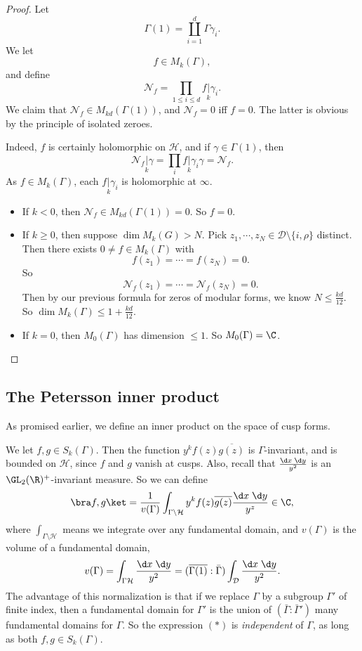 \documentclass[a4paper]{article}
\renewcommand{\H}{\mathcal{H}}
\begin{document}
\begin{proof}
  Let
  \[
    \Gamma(1) = \coprod_{i = 1}^d \Gamma \gamma_i.
  \]
  We let
  \[
    f \in M_k(\Gamma),
  \]
  and define
  \[
    \mathcal{N}_f = \prod_{1 \leq i \leq d} f\underset{k}{|} \gamma_i.
  \]
  We claim that $\mathcal{N}_f \in M_{kd} (\Gamma(1))$, and $\mathcal{N}_f = 0$ iff $f = 0$. The latter is obvious by the principle of isolated zeroes.

  Indeed, $f$ is certainly holomorphic on $\H$, and if $\gamma \in \Gamma(1)$, then
  \[
    \mathcal{N}_f\underset{k}{|} \gamma = \prod_i f\underset{k}{|} \gamma_i \gamma = \mathcal{N}_f.
  \]
  As $f \in M_k(\Gamma)$, each $f\underset{k}{|} \gamma_i$ is holomorphic at $\infty$.
  \begin{itemize}
    \item If $k < 0$, then $\mathcal{N}_f \in M_{kd} (\Gamma(1)) = 0$. So $f = 0$.
    \item If $k \geq 0$, then suppose $\dim M_k(G) > N$. Pick $z_1, \cdots, z_N \in \mathcal{D} \setminus \{i, \rho\}$ distinct. Then there exists $0 \not= f \in M_k(\Gamma)$ with
      \[
        f(z_1) = \cdots = f(z_N) = 0.
      \]
      So
      \[
        \mathcal{N}_f(z_1) = \cdots = \mathcal{N}_f (z_N) = 0.
      \]
      Then by our previous formula for zeros of modular forms, we know $N \leq \frac{kd}{12}$. So $\dim M_k(\Gamma) \leq1 + \frac{kd}{12}$.
    \item If $k = 0$, then $M_0(\Gamma)$ has dimension $\leq 1$. So $M_0(\Gamma) = \C$.
  \end{itemize}
\end{proof}

\subsection{The Petersson inner product}
As promised earlier, we define an inner product on the space of cusp forms.

We let $f, g \in S_k(\Gamma)$. Then the function $y^k f(z) \overline{g(z)}$ is $\Gamma$-invariant, and is bounded on $\H$, since $f$ and $g$ vanish at cusps. Also, recall that $\frac{\d x\; \d y}{y^2}$ is an $\GL_2(\R)^+$-invariant measure. So we can define
\[
  \bra f, g\ket = \frac{1}{v(\Gamma)} \int_{\Gamma \setminus \H} y^k f(z) \overline{g(z)} \frac{\d x\; \d y}{y^z} \in \C,
\]
where $\int_{\Gamma \setminus \H}$ means we integrate over any fundamental domain, and $v(\Gamma)$ is the volume of a fundamental domain,
\[
  v(\Gamma) = \int_{\Gamma \H} \frac{\d x\; \d y}{y^2} = (\overline{\Gamma(1)}:\bar{\Gamma}) \int_\mathcal{D} \frac{\d x\;\d y}{y^2}.
\]
The advantage of this normalization is that if we replace $\Gamma$ by a subgroup $\Gamma'$ of finite index, then a fundamental domain for $\Gamma'$ is the union of $(\bar{\Gamma}: \bar{\Gamma}')$ many fundamental domains for $\Gamma$. So the expression $(*)$ is \emph{independent} of $\Gamma$, as long as both $f, g \in S_k(\Gamma)$.
\end{document}
